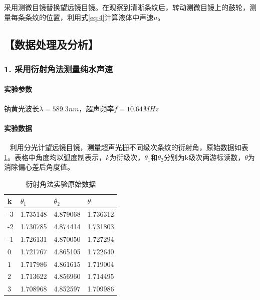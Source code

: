\documentclass[12pt,a4paper,UTF8]{ctexart}
\begin{document}
采用测微目镜替换望远镜目镜。在观察到清晰条纹后，转动测微目镜上的鼓轮，测量每条条纹的位置，利用式\ref{eq:4}计算液体中声速$u$。


\subsection*{【数据处理及分析】}
	\subsubsection*{1. 采用衍射角法测量纯水声速}
		\paragraph{实验参数} 钠黄光波长$\lambda = 589.3 nm$，超声频率$f = 10.64 MHz$
		\paragraph{实验数据}~
		\newline
		\indent
		利用分光计望远镜目镜，测量超声光栅不同级次条纹的衍射角，原始数据如表\ref{tab:1}。表格中角度均以弧度制表示，$k$为衍级次，$\theta_1$和$\theta_2$分别为k级次两游标读数，$\theta$为消除偏心差后角度值。
		\begin{table}[htbp]
			\centering
			\begin{tabular}{|l|l|l|l|}
			\hline
				k & $\theta_1$ & $\theta_2$ & $\theta$ \\ \hline
				-3 & 1.735148 & 4.879068 & 1.736312 \\ \hline
				-2 & 1.730785 & 4.874414 & 1.731803 \\ \hline
				-1 & 1.726131 & 4.870050 & 1.727294 \\ \hline
				0 & 1.721767 & 4.865105 & 1.722640 \\ \hline
				1 & 1.717986 & 4.861615 & 1.719004 \\ \hline
				2 & 1.713622 & 4.856960 & 1.714495 \\ \hline
				3 & 1.708968 & 4.852597 & 1.709986 \\ \hline
			\end{tabular}
			\caption{衍射角法实验原始数据}
			\label{tab:1}
		\end{table}
\end{document}
